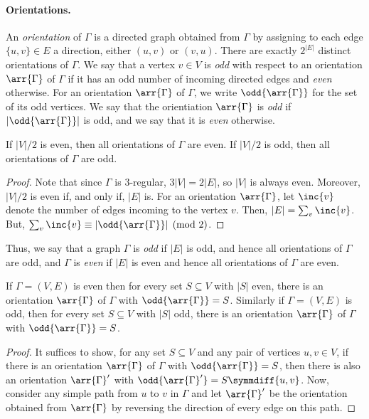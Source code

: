 \documentclass{toc}
\begin{document}
\paragraph{Orientations.}
An \emph{orientation} of $\Gamma$ is a directed graph obtained from $\Gamma$ by assigning
to each edge $\{u,v\} \in E$ a direction, either $(u,v)$ or $(v,u)$. There are
exactly $2^{|E|}$ distinct orientations of $\Gamma$. We say that a vertex $v \in V$
is \emph{odd} with respect to an orientation $\arr{\Gamma}$ of $\Gamma$ if it has an odd
number of incoming directed edges and \emph{even} otherwise. For an orientation
$\arr{\Gamma}$ of $\Gamma$, we write $\odd{\arr{\Gamma}}$ for the set of its odd vertices. We
say that the orientiation $\arr{\Gamma}$ is \emph{odd} if $|\odd{\arr{\Gamma}}|$ is odd,
and we say that
%
it is \emph{even} otherwise.
\begin{lemma}\label{lem:orientation-parity}
  If $|V|/2$ is even, then all orientations of $\Gamma$ are even. If $|V|/2$ is odd,
  then all orientations of $\Gamma$ are odd.
\end{lemma}
\begin{proof}
  Note that since $\Gamma$ is $3$-regular, $3|V| = 2|E|$, so $|V|$ is always even.
  Moreover, $|V|/2$ is even if, and only if, $|E|$ is. For an orientation
  $\arr{\Gamma}$, let $\inc{v}$ denote the number of edges incoming to the vertex
  $v$. Then, $|E| = \sum_v \inc{v}$. But, $\sum_v \inc{v} \equiv |\odd{\arr{\Gamma}}|
  \pmod 2$.
\end{proof}
Thus, we say that a graph $\Gamma$ is \emph{odd} if $|E|$ is odd, and hence all
orientations of $\Gamma$ are odd, and $\Gamma$ is \emph{even} if $|E|$ is even and hence
all orientations of $\Gamma$ are even.
\begin{lemma}\label{lem:transitive-parity}
  If $\Gamma = (V,E)$ is even then for every set $S \subseteq V$ with $|S|$ even,
  there is an orientation $\arr{\Gamma}$ of $\Gamma$ with $\odd{\arr{\Gamma}} = S$. Similarly
  if $\Gamma = (V,E)$ is odd, then for every set $S \subseteq V$ with $|S|$ odd,
  there is an orientation $\arr{\Gamma}$ of $\Gamma$ with $\odd{\arr{\Gamma}} = S$.
\end{lemma}
\begin{proof}
  It suffices to show, for any set $S \subseteq V$ and any pair of vertices $u,v
  \in V$, if there is an orientation $\arr{\Gamma}$ of $\Gamma$ with $\odd{\arr{\Gamma}} = S$,
  then there is also an orientation $\arr{\Gamma}'$ with $\odd{\arr{\Gamma}'} = S
  \symmdiff \{u,v\}$. Now, consider any simple path from $u$ to $v$ in $\Gamma$ and
  let $\arr{\Gamma}'$ be the orientation obtained from $\arr{\Gamma}$ by reversing the
  direction of every edge on this path.
\end{proof}
\end{document}
